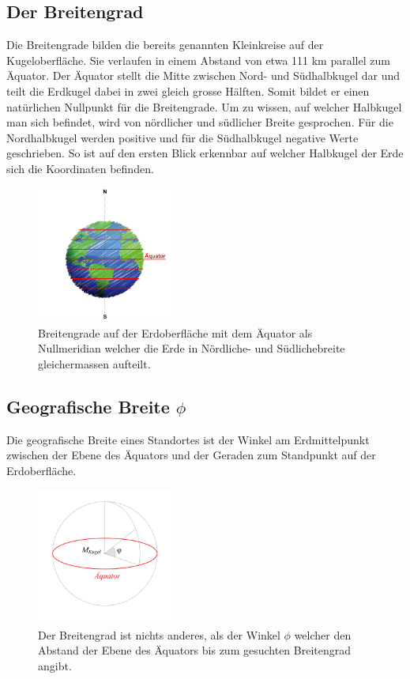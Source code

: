 \begin{refsection}
\section{Der Breitengrad}
Die Breitengrade bilden die bereits genannten Kleinkreise auf der Kugeloberfläche. Sie verlaufen in einem Abstand von etwa 111 km parallel zum Äquator. Der Äquator stellt die Mitte zwischen Nord- und Südhalbkugel dar und teilt die Erdkugel dabei in zwei gleich grosse Hälften. Somit bildet er einen natürlichen Nullpunkt für die Breitengrade.
Um zu wissen, auf welcher Halbkugel man sich befindet, wird von nördlicher und südlicher Breite gesprochen. Für die Nordhalbkugel werden positive und für die Südhalbkugel negative Werte geschrieben. So ist auf den ersten Blick erkennbar auf welcher Halbkugel der Erde sich die Koordinaten befinden.

\begin{figure}[htbp]
\centering
\includegraphics[width=0.4\textwidth]{kugel/BreiteErdkugel.jpg}
\caption{Breitengrade auf der Erdoberfläche mit dem Äquator als Nullmeridian welcher die Erde in Nördliche- und Südlichebreite gleichermassen aufteilt.}
\end{figure}



\subsection{Geografische Breite $\phi$}
\begin{definition}
Die geografische Breite eines Standortes ist der Winkel am Erdmittelpunkt zwischen der Ebene des Äquators und der Geraden zum Standpunkt auf der Erdoberfläche.
\end{definition}

\begin{figure}[hbtp]
\centering
\includegraphics[width=0.4\textwidth]{kugel/GeografischeBreite.jpg}
\caption{Der Breitengrad ist nichts anderes, als der Winkel $\phi$ welcher den Abstand der Ebene des Äquators bis zum gesuchten Breitengrad angibt.}
\end{figure}


\end{refsection}
